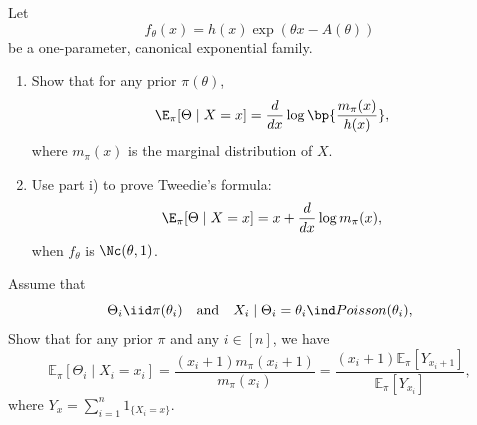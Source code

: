 \documentclass{article}
\begin{document}
\pagebreak

\begin{homeworkProblem}

  Let
  \[
    f_\theta(x) = h(x) \exp(\theta x - A(\theta))
  \]
  be a one-parameter, canonical exponential family.

  \begin{enumerate}[label=(\roman*), topsep=5pt, itemsep=5pt]
    \item Show that for any prior $\pi(\theta)$,
          \[
            \E_\pi [\Theta \mid X = x] = \frac{d}{dx} \log \bp{\frac{m_\pi(x)}{h(x)}},
          \]
          where $m_\pi(x)$ is the marginal distribution of $X$.
    \item Use part i) to prove Tweedie's formula:
          \[
            \E_\pi [ \Theta \mid X = x] = x + \frac{d}{dx} \log m_\pi(x),
          \]
          when $f_\theta$ is $\Nc(\theta, 1)$. \newline
  \end{enumerate}

  \solution

\end{homeworkProblem}

\pagebreak

\begin{homeworkProblem}

  Assume that
  \[
    \Theta_i \iid \pi(\theta_i) \quad \text{and} \quad X_i \mid \Theta_i = \theta_i \ind Poisson(\theta_i),
  \]
  Show that for any prior $\pi$ and any $i \in [n]$, we have
  \[
    \mathbb{E}_\pi\left[\Theta_i \mid X_i=x_i\right]=\frac{\left(x_i+1\right) m_\pi\left(x_i+1\right)}{m_\pi\left(x_i\right)}=\frac{\left(x_i+1\right) \mathbb{E}_\pi\left[Y_{x_i+1}\right]}{\mathbb{E}_\pi\left[Y_{x_i}\right]},
  \]
  where $Y_x = \sum_{i=1}^{n} 1_{\{X_i = x\}}$. \\

  \solution

\end{homeworkProblem}
\end{document}
